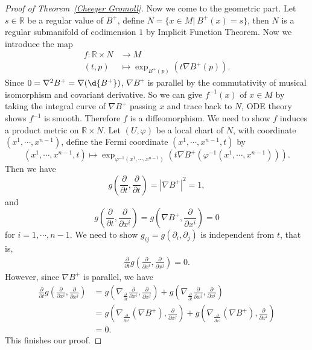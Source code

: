 \begin{proof}[Proof of Theorem~\ref{Cheeger Gromoll}]
    Now we come to the geometric part.
    Let $s\in\mathbb{R}$ be a regular value of $B^+$, define $N=\{x\in M|\ B^+(x)=s\}$, then $N$ is a regular submanifold of codimension $1$ by Implicit Function Theorem.
    Now we introduce the map
    \begin{align*}
        f:\mathbb{R}\times N&\to M\\
        (t,p)&\mapsto\exp_{B^+(p)}(t\nabla B^+(p)).
    \end{align*}
    Since $0=\nabla^2B^+=\nabla(\d{B^+})$, $\nabla B^+$ is parallel by the commutativity of musical isomorphism and covariant derivative.
    So we can give $f^{-1}(x)$ of $x\in M$ by taking the integral curve of $\nabla B^+$ passing $x$ and trace back to $N$, ODE theory shows $f^{-1}$ is smooth.
    Therefore $f$ is a diffeomorphism.
    We need to show $f$ induces a product metric on $\mathbb{R}\times N$.
    Let $(U,\varphi)$ be a local chart of $N$, with coordinate $(x^1,\cdots,x^{n-1})$, define the Fermi coordinate $(x^1,\cdots,x^{n-1},t)$ by
    \[(x^1,\cdots,x^{n-1},t)\mapsto\exp_{\varphi^{-1}(x^1,\cdots,x^{n-1})}(t\nabla B^+(\varphi^{-1}(x^1,\cdots,x^{n-1}))).\]
    Then we have
    \[g\left(\frac{\partial{}}{\partial{t}},\frac{\partial{}}{\partial{t}}\right)=|\nabla B^+|^2=1,\]
    and
    \[g\left(\frac{\partial{}}{\partial{t}},\frac{\partial{}}{\partial{x^i}}\right)=g\left(\nabla B^+,\frac{\partial{}}{\partial{x^i}}\right)=0\]
    for $i=1,\cdots,n-1$.
    We need to show $g_{ij}=g(\partial_i,\partial_j)$ is independent from $t$, that is,
    \begin{align*}
        \frac{\partial{}}{\partial{t}}g\left(\frac{\partial{}}{\partial{x^i}},\frac{\partial{}}{\partial{x^j}}\right)=0.
    \end{align*}
    However, since $\nabla B^+$ is parallel, we have
    \begin{align*}
        \frac{\partial{}}{\partial{t}}g\left(\frac{\partial{}}{\partial{x^i}},\frac{\partial{}}{\partial{x^j}}\right)&=g\left(\nabla_{\frac{\partial{}}{\partial{t}}}\frac{\partial{}}{\partial{x^i}},\frac{\partial{}}{\partial{x^j}}\right)+g\left(\nabla_{\frac{\partial{}}{\partial{t}}}\frac{\partial{}}{\partial{x^j}},\frac{\partial{}}{\partial{x^i}}\right)\\
        &=g\left(\nabla_{\frac{\partial{}}{\partial{x^i}}}(\nabla B^+),\frac{\partial{}}{\partial{x^j}}\right)+g\left(\nabla_{\frac{\partial{}}{\partial{x^j}}}(\nabla B^+),\frac{\partial{}}{\partial{x^i}}\right)\\
        &=0.
    \end{align*}
    This finishes our proof.
\end{proof}